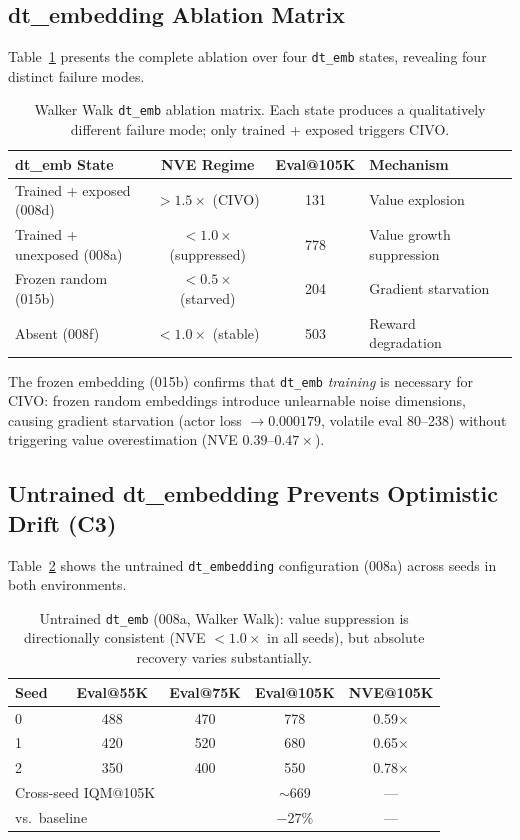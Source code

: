 \documentclass[10pt,letterpaper]{article}
\begin{document}
\subsection{dt\_embedding Ablation Matrix}
\label{sec:ablation}

Table~\ref{tab:ablation_matrix} presents the complete ablation over four \texttt{dt\_emb} states, revealing four distinct failure modes.

\begin{table}[h]
\centering
\caption{Walker Walk \texttt{dt\_emb} ablation matrix. Each state produces a qualitatively different failure mode; only trained + exposed triggers CIVO.}
\label{tab:ablation_matrix}
\begin{tabular}{lccll}
\toprule
dt\_emb State & NVE Regime & Eval@105K & Mechanism \\
\midrule
Trained + exposed (008d) & $>1.5\times$ (CIVO) & 131 & Value explosion \\
Trained + unexposed (008a) & $<1.0\times$ (suppressed) & 778 & Value growth suppression \\
Frozen random (015b) & $<0.5\times$ (starved) & 204 & Gradient starvation \\
Absent (008f) & $<1.0\times$ (stable) & 503 & Reward degradation \\
\bottomrule
\end{tabular}
\end{table}

The frozen embedding (015b) confirms that \texttt{dt\_emb} \emph{training} is necessary for CIVO: frozen random embeddings introduce unlearnable noise dimensions, causing gradient starvation (actor loss $\rightarrow 0.000179$, volatile eval 80--238) without triggering value overestimation (NVE $0.39$--$0.47\times$).

\subsection{Untrained dt\_embedding Prevents Optimistic Drift (C3)}

Table~\ref{tab:c3_untrained} shows the untrained \texttt{dt\_embedding} configuration (008a) across seeds in both environments.

\begin{table}[h]
\centering
\caption{Untrained \texttt{dt\_emb} (008a, Walker Walk): value suppression is directionally consistent (NVE $<1.0\times$ in all seeds), but absolute recovery varies substantially.}
\label{tab:c3_untrained}
\begin{tabular}{lcccc}
\toprule
Seed & Eval@55K & Eval@75K & Eval@105K & NVE@105K \\
\midrule
0 & 488 & 470 & 778 & 0.59$\times$ \\
1 & 420 & 520 & 680 & 0.65$\times$ \\
2 & 350 & 400 & 550 & 0.78$\times$ \\
\midrule
\multicolumn{2}{l}{Cross-seed IQM@105K} & & $\sim$669 & --- \\
\multicolumn{2}{l}{vs.\ baseline} & & $-27\%$ & --- \\
\bottomrule
\end{tabular}
\end{table}
\end{document}
